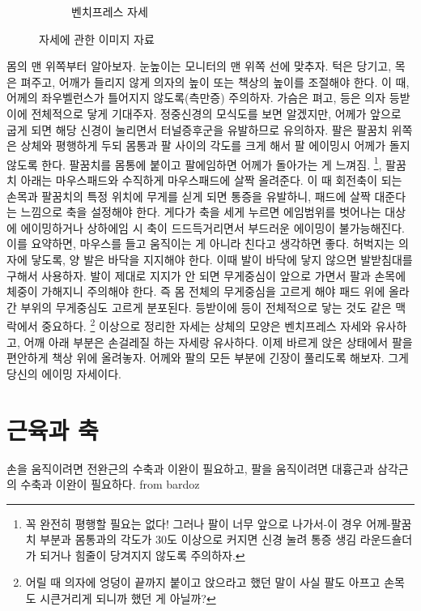 \begin{figure}[h]
\begin{subfigure}[b]{0.3\textwidth}
             \caption{벤치프레스 자세}
             \label{fig:1-c}
         \end{subfigure}
            \caption{자세에 관한 이미지 자료}
            \label{fig:impl1}
    \end{figure}

몸의 맨 위쪽부터 알아보자. 눈높이는 모니터의 맨 위쪽 선에 맞추자. 턱은 당기고, 목은 펴주고, 어깨가 들리지 않게 의자의 높이 또는 책상의 높이를 조절해야 한다. 이 때, 어께의 좌우벨런스가 틀어지지 않도록(측만증) 주의하자. 가슴은 펴고, 등은 의자 등받이에 전체적으로 닿게 기대주자. 정중신경의 모식도를 보면 알겠지만, 어께가 앞으로 굽게 되면 해당 신경이 눌리면서 터널증후군을 유발하므로 유의하자. 팔은 팔꿈치 위쪽은 상체와 평행하게 두되 몸통과 팔 사이의 각도를 크게 해서 팔 에이밍시 어께가 돌지 않도록 한다. 팔꿈치를 몸통에 붙이고 팔에임하면 어께가 돌아가는 게 느껴짐. \footnote{꼭 완전히 평행할 필요는 없다! 그러나 팔이 너무 앞으로 나가서-이 경우 어께-팔꿈치 부분과 몸통과의 각도가 30도 이상으로 커지면 신경 눌려 통증 생김 라운드숄더가 되거나 힘줄이 당겨지지 않도록 주의하자.}, 팔꿈치 아래는 마우스패드와 수직하게 마우스패드에 살짝 올려준다. 이 때 회전축이 되는 손목과 팔꿈치의 특정 위치에 무게를 싣게 되면 통증을 유발하니, 패드에 살짝 대준다는 느낌으로 축을 설정해야 한다. 게다가 축을 세게 누르면 에임범위를 벗어나는 대상에 에이밍하거나 상하에임 시 축이 드드득거리면서 부드러운 에이밍이 불가능해진다. 이를 요약하면, 마우스를 들고 움직이는 게 아니라 친다고 생각하면 좋다.
허벅지는 의자에 닿도록, 양 발은 바닥을 지지해야 한다. 이때 발이 바닥에 닿지 않으면 발받침대를 구해서 사용하자. 발이 제대로 지지가 안 되면 무게중심이 앞으로 가면서 팔과 손목에 체중이 가해지니 주의해야 한다. 즉 몸 전체의 무게중심을 고르게 해야 패드 위에 올라간 부위의 무게중심도 고르게 분포된다. 등받이에 등이 전체적으로 닿는 것도 같은 맥락에서 중요하다. \footnote{어릴 때 의자에 엉덩이 끝까지 붙이고 앉으라고 했던 말이 사실 팔도 아프고 손목도 시큰거리게 되니까 했던 게 아닐까?} 이상으로 정리한 자세는 상체의 모양은 벤치프레스 자세와 유사하고, 어깨 아래 부분은 손걸레질 하는 자세랑 유사하다. 
이제 바르게 앉은 상태에서 팔을 편안하게 책상 위에 올려놓자. 어께와 팔의 모든 부분에 긴장이 풀리도록 해보자. 그게 당신의 에이밍 자세이다.

\section{근육과 축}
손을 움직이려면 전완근의 수축과 이완이 필요하고, 팔을 움직이려면 대흉근과 삼각근의 수축과 이완이 필요하다. from bardoz


